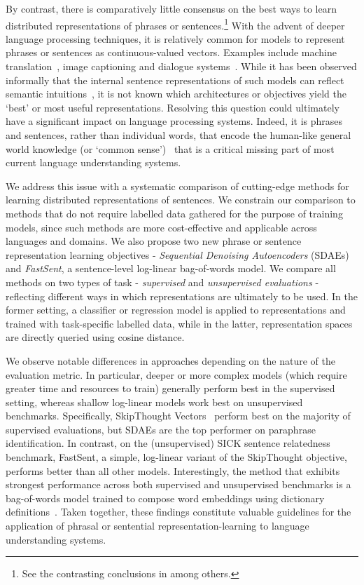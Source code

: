 \documentclass[11pt,letterpaper]{article}
\begin{document}
By contrast, there is comparatively little consensus on the best ways to learn distributed representations of phrases or sentences.\footnote{See the contrasting conclusions in \cite{mitchell2008vector,clark2007combining,baroni2014frege,milajevs2014evaluating} among others.} With the advent of deeper language processing techniques, it is relatively common for models to represent phrases or sentences as continuous-valued vectors. Examples include machine translation~\cite{sutskever2014sequence}, image captioning \cite{mao2014deep} and dialogue systems~\cite{serban2015building}. While it has been observed informally that the internal sentence representations of such models can reflect semantic intuitions~\cite{cho2014learning}, it is not known which architectures or objectives yield the `best' or most useful representations. Resolving this question could ultimately have a significant impact on language processing systems. Indeed, it is phrases and sentences, rather than individual words, that encode the human-like general world knowledge (or `common sense')~\cite{norman1972memory} that is a critical missing part of most current language understanding systems.

We address this issue with a systematic comparison of cutting-edge methods for learning distributed representations of sentences. We constrain our comparison to methods that do not require labelled data gathered for the purpose of training models, since such methods are more cost-effective and applicable across languages and domains. We also propose two new phrase or sentence representation learning objectives - \emph{Sequential Denoising Autoencoders} (SDAEs) and \emph{FastSent}, a sentence-level log-linear bag-of-words model. We compare all methods on two types of task - \emph{supervised} and \emph{unsupervised evaluations} - reflecting different ways in which representations are ultimately to be used. In the former setting, a classifier or regression model is applied to representations and trained with task-specific labelled data, while in the latter, representation spaces are directly queried using cosine distance.    

We observe notable differences in approaches depending on the nature of the evaluation metric. In particular, deeper or more complex models (which require greater time and resources to train) generally perform best in the supervised setting, whereas shallow log-linear models work best on unsupervised benchmarks. Specifically, SkipThought Vectors~\cite{kiros2015skip} perform best on the majority of supervised evaluations, but SDAEs are the top performer on paraphrase identification. In contrast, on the (unsupervised) SICK sentence relatedness benchmark, FastSent, a simple, log-linear variant of the SkipThought objective, performs better than all other models. Interestingly, the method that exhibits strongest performance across both supervised and unsupervised benchmarks is a bag-of-words model trained to compose word embeddings using dictionary definitions~\cite{hill2015learning}. Taken together, these findings constitute valuable guidelines for the application of phrasal or sentential representation-learning to language understanding systems.
\end{document}
